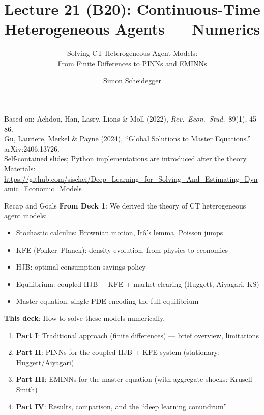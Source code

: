 \documentclass[aspectratio=169,11pt]{beamer}
\title[Lecture 21 (B20)]{Lecture 21 (B20): Continuous-Time Heterogeneous Agents --- Numerics}
\subtitle{Solving CT Heterogeneous Agent Models:\\From Finite Differences to PINNs and EMINNs}
\author{Simon Scheidegger}
\institute{HEC, University of Lausanne}
\date{}
\newcommand{\emphc}[1]{\textcolor{harvardcrimson}{#1}}
\begin{document}

{
\begin{frame}
\titlepage
\vspace{-0.4cm}
\begin{center}
{\footnotesize Based on: Achdou, Han, Lasry, Lions \& Moll (2022), \emph{Rev.\ Econ.\ Stud.}\ 89(1), 45--86.}\\[2pt]
{\footnotesize Gu, Lauriere, Merkel \& Payne (2024), ``Global Solutions to Master Equations.'' arXiv:2406.13726.}\\[2pt]
{\footnotesize Self-contained slides; Python implementations are introduced after the theory.}\\[4pt]
{\footnotesize Materials: \url{https://github.com/sischei/Deep_Learning_for_Solving_And_Estimating_Dynamic_Economic_Models}}
\end{center}
\end{frame}
}

\begin{frame}{Recap and Goals}
\textbf{From Deck 1}: We derived the \emphc{theory} of CT heterogeneous agent models:
\begin{itemize}\itemsep2pt
    \item Stochastic calculus: Brownian motion, It\^o's lemma, Poisson jumps
    \item KFE (Fokker--Planck): density evolution, from physics to economics
    \item HJB: optimal consumption-savings policy
    \item Equilibrium: coupled HJB + KFE + market clearing (Huggett, Aiyagari, KS)
    \item Master equation: single PDE encoding the full equilibrium
\end{itemize}

\vspace{0.4em}
\textbf{This deck}: How to \emphc{solve} these models numerically.
\begin{enumerate}\itemsep3pt
    \item \textbf{Part I}: Traditional approach (finite differences) --- brief overview, limitations
    \item \textbf{Part II}: \emphc{PINNs for the coupled HJB + KFE system} (stationary: Huggett/Aiyagari)
    \item \textbf{Part III}: \emphc{EMINNs for the master equation} (with aggregate shocks: Krusell--Smith)
    \item \textbf{Part IV}: Results, comparison, and the ``deep learning conundrum''
\end{enumerate}
\end{frame}
\end{document}

